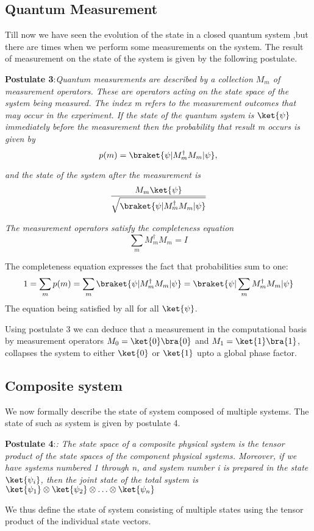 \subsection{Quantum Measurement}
Till now we have seen the evolution of the state in a closed quantum system ,but there are times when we perform some measurements on the system. The result of measurement on the state of the system is given by the following postulate.\par
\textbf{Postulate 3}:\textit{Quantum measurements are described by a collection {$M_m$} of measurement operators. These are operators acting on the state space of the system being measured. The index m refers to the measurement outcomes that may occur in the experiment. If the state of the quantum system is $\ket{\psi}$
immediately before the measurement then the probability that result m occurs is given by}
$$ p(m) = \braket{\psi|M_m^{\dagger} M_m|\psi} ,$$\par
\textit{and the state of the system after the measurement is 
}
$$ \frac{M_m \ket{\psi}}{\sqrt{\braket{\psi|M_m^{\dagger} M_m|\psi}}}$$
\par \textit{The measurement operators satisfy the completeness equation}
$$ \sum_m M_m^{\dagger}M_m = I$$
\par 
The completeness equation expresses the fact that probabilities sum to one:
$$1 = \sum_m p(m) = \sum_m \braket{\psi|M_m^{\dagger} M_m|\psi} 
= \braket{\psi | \sum_m M_m^{\dagger}M_m|\psi}$$
The equation being satisfied by all for all $\ket{\psi}$.\par
Using postulate 3 we can deduce that a measurement in the computational basis by measurement operators $M_0 = \ket{0}\bra{0}$
and $M_1 = \ket{1}\bra{1}$, collapses the system to either $\ket{0}$
or $\ket{1}$ upto a global phase factor. 

\subsection{Composite system}
We now formally describe the state of system composed of multiple systems. The state of such as system is given by postulate 4.\par

\textbf{Postulate 4}:\textit{: The state space of a composite physical system is the tensor product of the state spaces of the component physical systems. Moreover, if we have systems numbered 1 through n, and system number i is prepared in the state $\ket{\psi_i}$, then the joint state of the total system is $\ket{\psi_1} \otimes \ket{\psi_2}\otimes \hdots \otimes \ket{\psi_n}$}
\par \hspace{10px} \break We thus define the state of system consisting of multiple states using the tensor product of the individual state vectors.
\newline 

